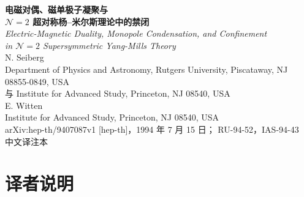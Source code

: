 \documentclass[11pt,a4paper,UTF8,fontset=fandol]{ctexart}
\theoremstyle{plain}
\theoremstyle{definition}
\begin{document}
\sloppy

\begin{center}
  {\LARGE\bfseries 电磁对偶、磁单极子凝聚与\\[4pt]
   $\mathcal{N}=2$ 超对称杨--米尔斯理论中的禁闭}\\[10pt]
  {\large\itshape Electric-Magnetic Duality, Monopole Condensation,
   and Confinement\\[2pt]
   in $\mathcal{N}=2$ Supersymmetric Yang-Mills Theory}\\[20pt]
  {\large N. Seiberg}\\[4pt]
  {\small Department of Physics and Astronomy, Rutgers University,
   Piscataway, NJ 08855-0849, USA\\
   与 Institute for Advanced Study, Princeton, NJ 08540, USA}\\[10pt]
  {\large E. Witten}\\[4pt]
  {\small Institute for Advanced Study, Princeton, NJ 08540, USA}\\[16pt]
  {\small arXiv:hep-th/9407087v1 [hep-th]，1994 年 7 月 15 日；
   RU-94-52，IAS-94-43\\[2pt]
   中文译注本}
\end{center}
\vspace{6pt}

\begin{abstract}
\noindent
我们研究四维 $\mathcal{N}=2$ 超对称规范理论（规范群为 $SU(2)$）的真空结构与双荷子谱。
这一理论具有极其丰富而物理的性质，却仍能被精确描述：例如，电子与双荷子的质量、以及
真空模空间上的度规，都可以得到精确公式。这一描述涉及 Olive--Montonen 电磁对偶的一个
版本。所谓“强耦合”真空，其实是一个磁单极子的弱耦合理论；在适当的微扰下，禁闭由磁单
极子凝聚来描述。
\end{abstract}

\section*{译者说明}
\end{document}
